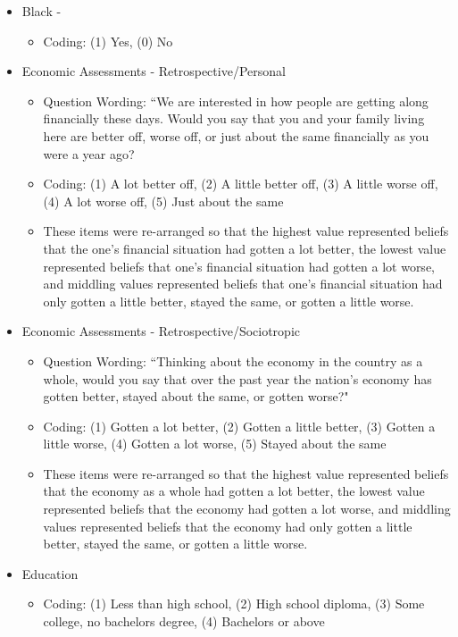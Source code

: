 \documentclass[12pt]{article}
\begin{document}
\begin{appendices}
\begin{refsection}
\begin{itemize}
	\item Black - 
		\begin{itemize}
			\item Coding: (1) Yes, (0) No
		\end{itemize}
				
	\item Economic Assessments - Retrospective/Personal
		\begin{itemize}
			\item Question Wording: ``We are interested in how people are getting along financially these days. Would you say that you and your family living here are better off, worse off, or just about the same financially as you were a year ago?
			\item Coding: (1) A lot better off, (2) A little better off, (3) A little worse off, (4) A lot worse off, (5) Just about the same
			\item These items were re-arranged so that the highest value represented beliefs that the one's financial situation had gotten a lot better, the lowest value represented beliefs that one's financial situation had gotten a lot worse, and middling values represented beliefs that one's financial situation had only gotten a little better, stayed the same, or gotten a little worse. 
		\end{itemize}
		
	\item Economic Assessments - Retrospective/Sociotropic
		\begin{itemize}
			\item Question Wording: ``Thinking about the economy in the country as a whole, would you say that over the past year the nation's economy has gotten better, stayed about the same, or gotten worse?"
			\item Coding: (1) Gotten a lot better, (2) Gotten a little better, (3) Gotten a little worse, (4) Gotten a lot worse, (5) Stayed about the same
			\item These items were re-arranged so that the highest value represented beliefs that the economy as a whole had gotten a lot better, the lowest value represented beliefs that the economy had gotten a lot worse, and middling values represented beliefs that the economy had only gotten a little better, stayed the same, or gotten a little worse. 
		\end{itemize}
		
	\item Education
		\begin{itemize}
			\item Coding: (1) Less than high school, (2) High school diploma, (3) Some college, no bachelors degree, (4) Bachelors or above
		\end{itemize}
		

\end{itemize}
\end{refsection}
\end{appendices}
\end{document}
